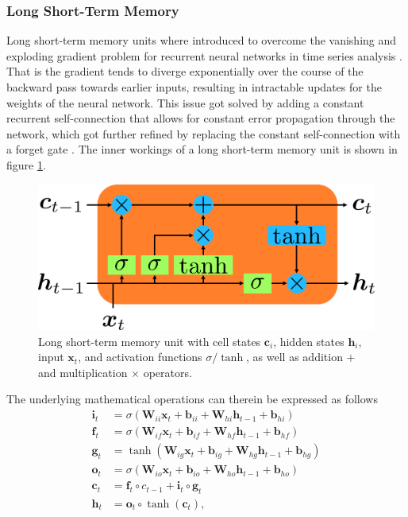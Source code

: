 \subsubsection{Long Short-Term Memory}
Long short-term memory units where introduced to overcome the vanishing and exploding gradient problem for recurrent neural networks in time series analysis \cite{hochreiter1997long}. That is the gradient tends to diverge exponentially over the course of the backward pass towards earlier inputs, resulting in intractable updates for the weights of the neural network. This issue got solved by adding a constant recurrent self-connection that allows for constant error propagation through the network, which got further refined by replacing the constant self-connection with a forget gate \cite{gers1999learning}. The inner workings of a long short-term memory unit is shown in figure \ref{fig::321_lstm}. 
\begin{figure}[h]
	\centering
	\includegraphics[scale=.28]{chapters/03_background/img/lstm.png}
	\caption{Long short-term memory unit with cell states $\bm{c}_i$, hidden states $\bm{h}_i$, input $\bm{x}_t$, and activation functions $\sigma/\tanh$, as well as addition $+$ and multiplication $\times$ operators.}
	\label{fig::321_lstm}
\end{figure}
The underlying mathematical operations can therein be expressed as follows
\begin{align}
	\bm{i}_t &= \sigma(\bm{W}_{ii}\bm{x}_t+\bm{b}_{ii}+\bm{W}_{hi}\bm{h}_{t-1}+\bm{b}_{hi})\\
	\bm{f}_t &= \sigma(\bm{W}_{if}\bm{x}_t+\bm{b}_{if}+\bm{W}_{hf}\bm{h}_{t-1}+\bm{b}_{hf})\\
	\bm{g}_t &= \tanh(\bm{W}_{ig}\bm{x}_t+\bm{b}_{ig}+\bm{W}_{hg}\bm{h}_{t-1}+\bm{b}_{hg})\\
	\bm{o}_t &= \sigma(\bm{W}_{io}\bm{x}_t+\bm{b}_{io}+\bm{W}_{ho}\bm{h}_{t-1}+\bm{b}_{ho})\\
	\bm{c}_t &= \bm{f}_t\circ c_{t-1} + \bm{i}_t\circ\bm{g}_t\\
	\bm{h}_t &= \bm{o}_t \circ\tanh(\bm{c}_t),
\end{align}
